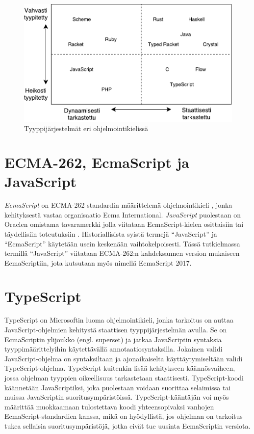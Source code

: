 \begin{figure}
\centering
\includegraphics{images/type-systems.pdf}
\caption{Tyyppijärjestelmät eri ohjelmointikielissä}
\end{figure}

\section{ECMA-262, EcmaScript ja JavaScript}
\textit{EcmaScript} on ECMA-262 standardin määrittelemä ohjelmointikieli
\cite{JavaScriptLanguageResources, Ecma262}, jonka kehityksestä vastaa
organisaatio Ecma International. \textit{JavaScript} puolestaan on Oraclen omistama
tavaramerkki jolla viitataan EcmaScript-kielen osittaisiin tai täydellisiin
toteutuksiin \cite{JavaScriptLanguageResources}. Historiallisista syistä termejä
``JavaScript'' ja ``EcmaScript'' käytetään usein keskenään vaihtokelpoisesti.
Tässä tutkielmassa termillä ``JavaScript'' viitataan ECMA-262:n kahdeksannen
version mukaiseen EcmaScriptiin, jota kutsutaan myös nimellä EcmaScript 2017.

\section{TypeScript}
TypeScript on Microsoftin luoma ohjelmointikieli, jonka tarkoitus on
auttaa JavaScript-ohjelmien kehitystä staattisen tyyppijärjestelmän avulla.
Se on EcmaScriptin ylijoukko (engl. superset) \cite{TypeScriptSpec} ja jatkaa
JavaScriptin syntaksia tyyppimäärittelyihin käytettävällä
annotaatiosyntaksilla. Jokainen validi JavaScript-ohjelma on syntaksiltaan ja
ajonaikaiselta käyttäytymiseltään validi TypeScript-ohjelma. TypeScript
kuitenkin lisää kehitykseen käännösvaiheen, jossa ohjelman tyyppien
oikeellisuus tarkastetaan staattisesti. TypeScript-koodi käännetään
JavaScriptiksi, joka puolestaan voidaan suorittaa selaimissa tai muissa
JavaScriptin suoritusympäristöissä. TypeScript-kääntäjän voi myös määrittää
muokkaamaan tulostettava koodi yhteensopivaksi vanhojen
EcmaScript-standardien kanssa, mikä on hyödyllistä, jos ohjelman on tarkoitus
tukea sellaisia suoritusympäristöjä, jotka eivät tue uusinta EcmaScriptin
versiota.

